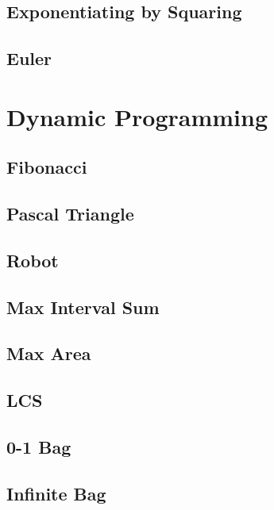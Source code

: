     \subsection{Exponentiating by Squaring}
        
    \subsection{Euler}
        

\section{Dynamic Programming}
    \subsection{Fibonacci}
            
    \subsection{Pascal Triangle}
        
    \subsection{Robot}
        
    \subsection{Max Interval Sum}
        
    \subsection{Max Area}
        
    \subsection{LCS}
        
    \subsection{0-1 Bag}
        
    \subsection{Infinite Bag}
        
